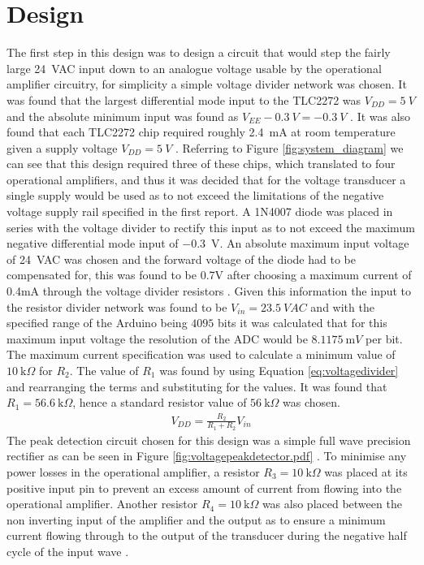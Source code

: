 \section{Design} \label{sec:design_voltage_peak_transducer}
The first step in this design was to design a circuit that would step the fairly large \SI{24}{VAC} input down to an analogue voltage usable by the operational amplifier circuitry, for simplicity a simple voltage divider network was chosen. It was found that the largest differential mode input to the TLC2272 was  $V_{DD}=\SI{5}{V}$ and the absolute minimum input was found as $V_{EE}-\SI{0.3}{V}=\SI{-0.3}{V}$ \cite{TLC2272:2016}. It was also found that each TLC2272 chip required roughly \SI{2.4}{\milli A} at room temperature given a supply voltage $V_{DD}=\SI{5}{V}$ \cite{TLC2272:2016}. Referring to Figure \ref{fig:system_diagram} we can see that this design required three of these chips, which translated to four operational amplifiers, and thus it was decided that for the voltage transducer a single supply would be used as to not exceed the limitations of the negative voltage supply rail specified in the first report. A 1N4007 diode was placed in series with the voltage divider to rectify this input as to not exceed the maximum negative differential mode input of \SI{-0.3}{V}.\vspace{4mm} \newline An absolute maximum input voltage of \SI{24}{VAC} was chosen and the forward voltage of the diode had to be compensated for, this was found to be 0.7V after choosing a maximum current of 0.4mA through the voltage divider resistors \cite{1N4007:2014}. Given this information the input to the resistor divider network was found to be $V_{in}=\SI{23.5}{VAC}$ and with the specified range of the Arduino being $4095$ bits it was calculated that for this maximum input voltage the resolution of the ADC would be $\SI{8.1175}{\milli V}$ per bit. The maximum current specification was used to calculate a minimum value of $\SI{10}{\kilo \Omega}$ for $R_{2}$. The value of $R_{1}$ was found by using Equation \ref{eq:voltagedivider} and rearranging the terms and substituting for the values. It was found that $R_{1}=\SI{56.6}{\kilo \Omega}$, hence a standard resistor value of $\SI{56}{\kilo \Omega}$ was chosen.
\begin{align}
   V_{DD}=\frac{R_2}{R_1+R_2}V_{in}
   \label{eq:voltagedivider}
\end{align}
The peak detection circuit chosen for this design was a simple full wave precision rectifier as can be seen in Figure \ref{fig:voltagepeakdetector.pdf} \cite{PrecisionRectifierFullwave}. To minimise any power losses in the operational amplifier, a resistor $R_3=\SI{10}{\kilo \Omega}$ was placed at its positive input pin to prevent an excess amount of current from flowing into the operational amplifier. Another resistor $R_4=\SI{10}{\kilo \Omega}$ was also placed between the non inverting input of the amplifier and the output as to ensure a minimum current flowing through to the output of the transducer during the negative half cycle of the input wave \cite{PrecisionRectifierFullwave}. 
